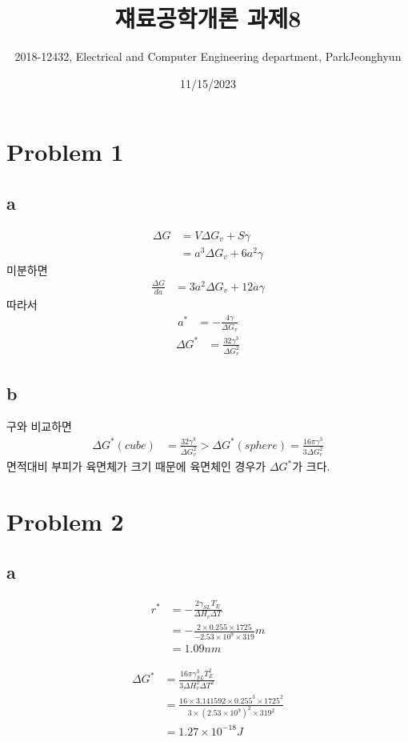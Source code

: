 \documentclass[a4paper]{oblivoir}
\title{쟤료공학개론 과제8}
\author{2018-12432, Electrical and Computer Engineering department, ParkJeonghyun}
\date{11/15/2023}
\begin{document}
\maketitle
\section{Problem 1}
\subsection{a}
\begin{align}
	\Delta G &= V\Delta G_{v} + S \gamma\\
	&= a^{3}\Delta G_{v} + 6a^{2}\gamma
\end{align}
미분하면
\begin{align}
	\frac{\Delta G}{da} &= 3a^{2}\Delta G_{v} + 12a\gamma
\end{align}
따라서
\begin{align}
	a^{*} &= - \frac{4\gamma}{\Delta G_{v}}
\end{align}
\begin{align}
	\Delta G^{*} &= \frac{32\gamma^{3}}{\Delta G_{v}^{2}}
\end{align}

\subsection{b}
구와 비교하면 
\begin{align}
	\Delta G^{*}(cube) &= \frac{32\gamma^{3}}{\Delta G_{v}^{2}} > \Delta G^{*}(sphere) =\frac{16\pi\gamma^{3}}{3\Delta G_{v}^{2}}
\end{align}
면적대비 부피가 육면체가 크기 때문에 육면체인 경우가 $\Delta G^{*}$가 크다. 


\section{Problem 2}
\subsection{a}
\begin{align}
	r^{*} &= -\frac{2\gamma_{SL} T_{E}}{\Delta H_{v}\Delta T}\\
	&= - \frac{2\times0.255\times1725}{-2.53\times10^{9}\times319}m\\
	&= 1.09nm
\end{align}

\begin{align}
	\Delta G^{*} &= \frac{16\pi\gamma^{3}_{SL}T_{E}^{2}}{3\Delta H_{v}^{2}\Delta T^{2}}\\
	&=\frac{16\times3.141592\times0.255^{3}\times1725^{2}}{3\times(2.53\times10^{9})^{2}\times319^{2}}\\
	&= 1.27\times 10^{-18}J
\end{align}
\end{document}
